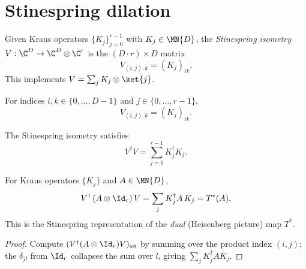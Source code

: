 \section{Stinespring dilation}
\label{sec:stinespring}

\begin{definition}\label{def:stinespring_v}
    \leanok
    Given Kraus operators $\{K_j\}_{j=0}^{r-1}$ with
    $K_j \in \MN{D}$, the \emph{Stinespring isometry}
    $V : \C^D \to \C^D \otimes \C^r$ is the
    $(D \cdot r) \times D$ matrix
    \[
        V_{(i,j),k} = (K_j)_{ik}.
    \]
    This implements $V = \sum_j K_j \otimes \ket{j}$.
\end{definition}

\begin{lemma}\label{lem:stinespring_v_apply}
    \leanok
    For indices $i,k \in \{0,\ldots,D-1\}$ and $j \in \{0,\ldots,r-1\}$,
    \[
        V_{(i,j),k} = (K_j)_{ik}.
    \]
\end{lemma}

\begin{theorem}\label{thm:stinespring_v_conjTranspose_mul}
    \leanok
    The Stinespring isometry satisfies
    \[
        V^\dagger V = \sum_{j=0}^{r-1} K_j^\dagger K_j.
    \]
\end{theorem}

\begin{theorem}\label{thm:stinespring_dual_representation}
    \leanok
    For Kraus operators $\{K_j\}$ and $A \in \MN{D}$,
    \[
        V^\dagger\,(A \otimes \Id_r)\,V
        = \sum_j K_j^\dagger A\,K_j
        = T^*(A).
    \]
    This is the Stinespring representation of the \emph{dual} (Heisenberg
    picture) map $T^*$.
\end{theorem}

\begin{proof}
    \leanok
    Compute $(V^\dagger (A \otimes \Id_r) V)_{ab}$
    by summing over the product index $(i,j)$;
    the $\delta_{jl}$ from $\Id_r$ collapses the sum over $l$, giving
    $\sum_j K_j^\dagger A K_j$.
\end{proof}


